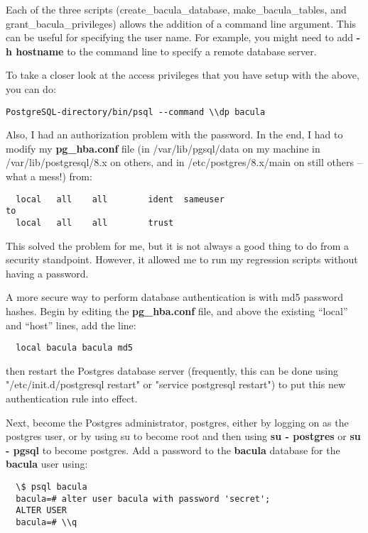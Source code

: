 Each of the three scripts (create\_bacula\_database, make\_bacula\_tables, and
grant\_bacula\_privileges) allows the addition of a command line argument.
This can be useful for specifying the user name. For example, you might need
to add {\bf -h hostname} to the command line to specify a remote database
server. 

To take a closer look at the access privileges that you have setup with the
above, you can do: 

\footnotesize
\begin{verbatim}
PostgreSQL-directory/bin/psql --command \\dp bacula
\end{verbatim}
\normalsize

Also, I had an authorization problem with the password. In the end,
I had to modify my {\bf pg\_hba.conf} file (in /var/lib/pgsql/data on my machine
in /var/lib/postgresql/8.x on others, and in /etc/postgres/8.x/main on
still others -- what a mess!) from:

\footnotesize
\begin{verbatim}
  local   all    all        ident  sameuser
to
  local   all    all        trust
\end{verbatim}
\normalsize

This solved the problem for me, but it is not always a good thing
to do from a security standpoint.  However, it allowed me to run
my regression scripts without having a password.

A more secure way to perform database authentication is with md5
password hashes.  Begin by editing the {\bf pg\_hba.conf} file, and
above the existing ``local'' and ``host'' lines, add the line:

\footnotesize
\begin{verbatim}
  local bacula bacula md5
\end{verbatim}
\normalsize

then restart the Postgres database server (frequently, this can be done
using "/etc/init.d/postgresql restart" or "service postgresql restart") to
put this new authentication rule into effect.

Next, become the Postgres administrator, postgres, either by logging
on as the postgres user, or by using su to become root and then using
{\bf su - postgres} or {\bf su - pgsql} to become postgres.  
Add a password to the {\bf bacula} database for the {\bf bacula} user using:

\footnotesize
\begin{verbatim}
  \$ psql bacula
  bacula=# alter user bacula with password 'secret';
  ALTER USER
  bacula=# \\q
\end{verbatim}
\normalsize

